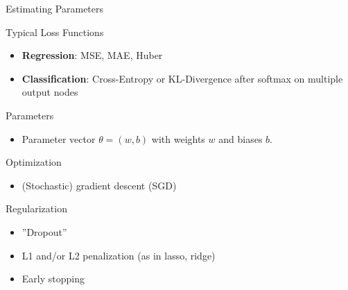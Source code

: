 \documentclass[ignorenonframetext,xcolor=x11names]{beamer}
\begin{document}
\begin{frame}{Estimating Parameters}
\footnotesize
\begin{block}{Typical Loss Functions}
\begin{itemize}  
  \item \textbf{Regression}: MSE, MAE, Huber
  \item \textbf{Classification}: Cross-Entropy or KL-Divergence after softmax on multiple output nodes 
\end{itemize}
\end{block}
\begin{block}{Parameters}
\begin{itemize}
  \item Parameter vector $\theta = (w, b)$ with weights $w$ and biases $b$. 
\end{itemize}
\end{block}
\begin{block}{Optimization}
\begin{itemize}
  \item (Stochastic) gradient descent (SGD)
\end{itemize}
\end{block}
\begin{block}{Regularization}
\begin{itemize}
  \item ''Dropout''
  \item L1 and/or L2 penalization (as in lasso, ridge)
  \item Early stopping
\end{itemize}
\end{block}
\end{frame}
\end{document}
